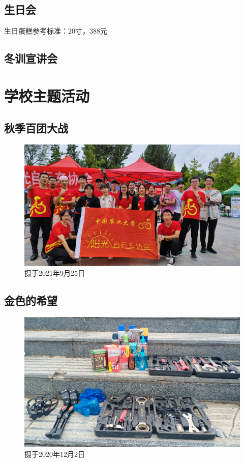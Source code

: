 \documentclass{ctexbook}
\begin{document}
\subsection{生日会}
    生日蛋糕参考标准：20寸，388元

\subsection{冬训宣讲会}


\section{学校主题活动}
\subsection{秋季百团大战}
\begin{figure}[htp]
    \centering
    \includegraphics[width=0.7\linewidth]{fig/百团大战}
    \caption{摄于2021年9月25日}
    \label{fig:}
\end{figure}

\subsection{金色的希望}
\begin{figure}[htp]
    \centering
    \includegraphics[width=0.7\linewidth]{fig/金色的希望}
    \caption{摄于2020年12月2日}
    \label{fig:}
\end{figure}
\end{document}
